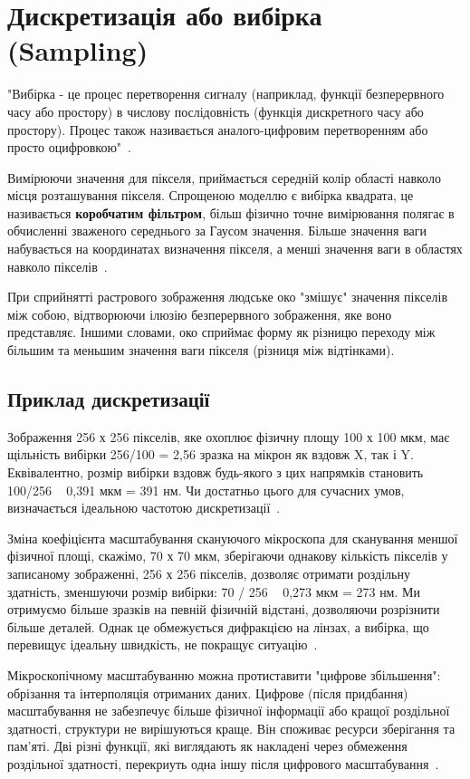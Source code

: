 \chapter{Дискретизація або вибірка (Sampling)}\label{cha:sampling}
"Вибірка - це процес перетворення сигналу (наприклад, функції безперервного часу або простору) в числову послідовність (функція дискретного часу або простору).
Процес також називається аналого-цифровим перетворенням або просто оцифровкою"~\cite{wiki_sampling:2}.

Вимірюючи значення для пікселя, приймається середній колір області навколо місця розташування пікселя.
Спрощеною моделлю є вибірка квадрата, це називається \textbf{коробчатим фільтром}, більш фізично точне вимірювання полягає в обчисленні зваженого середнього за Гаусом значення.
Більше значення ваги набувається на координатах визначення пікселя, а менші значення ваги в областях навколо пікселів~\cite{gimp:1}.

При сприйнятті растрового зображення людське око "змішує" значення пікселів між собою, відтворюючи ілюзію безперервного зображення, яке воно представляє.
Іншими словами, око сприймає форму як різницю переходу між більшим та меньшим значення ваги пікселя (різниця між відтінками).

\section{Приклад дискретизації}\label{sec:example_of_sampling}
Зображення 256 х 256 пікселів, яке охоплює фізичну площу 100 х 100 мкм, має щільність вибірки 256/100 = 2,56 зразка на мікрон як вздовж X, так і Y.
Еквівалентно, розмір вибірки вздовж будь-якого з цих напрямків становить 100/256 ~ 0,391 мкм = 391 нм.
Чи достатньо цього для сучасних умов, визначається ідеальною частотою дискретизації~\cite{svi_sampling:3}.

Зміна коефіцієнта масштабування скануючого мікроскопа для сканування меншої фізичної площі, скажімо, 70 х 70 мкм, зберігаючи однакову кількість пікселів у записаному зображенні, 256 х 256 пікселів, дозволяє отримати роздільну здатність, зменшуючи розмір вибірки: 70 / 256 ~ 0,273 мкм = 273 нм.
Ми отримуємо більше зразків на певній фізичній відстані, дозволяючи розрізнити більше деталей.
Однак це обмежується дифракцією на лінзах, а вибірка, що перевищує ідеальну швидкість, не покращує ситуацію~\cite{svi_sampling:3}.

Мікроскопічному масштабуванню можна протиставити "цифрове збільшення": обрізання та інтерполяція отриманих даних.
Цифрове (після придбання) масштабування не забезпечує більше фізичної інформації або кращої роздільної здатності, структури не вирішуються краще.
Він споживає ресурси зберігання та пам'яті.
Дві різні функції, які виглядають як накладені через обмеження роздільної здатності, перекриуть одна іншу після цифрового масштабування~\cite{svi_sampling:3}.
